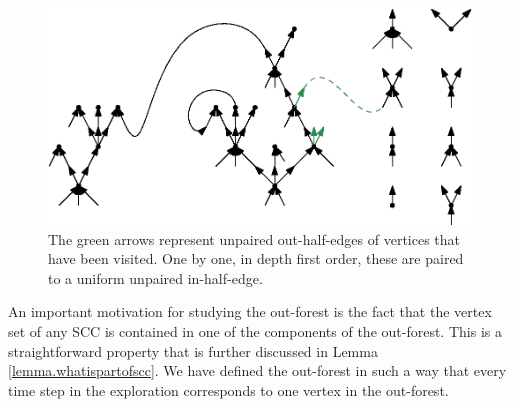 \begin{figure}
    \centering
    \includegraphics[scale=0.6]{Content/Pictures/configuration_model.eps}
    \caption{The green arrows represent unpaired out-half-edges of vertices that have been visited. One by one, in depth first order, these are paired to a uniform unpaired in-half-edge.}
    \label{fig.configuration model}
\end{figure}

An important motivation for studying the out-forest is the fact that the vertex set of any SCC is contained in one of the components of the out-forest. This is a straightforward property that is further discussed in Lemma \ref{lemma.whatispartofscc}. We have defined the out-forest in such a way that every time step in the exploration corresponds to one vertex in the out-forest. 


